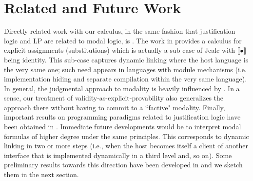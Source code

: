         \section{Related and Future Work}
        \label{relat}
        Directly related work with our calculus, in the same fashion that justification logic and LP \cite{Artemov2001} are related to modal logic, is \cite{Bellin2001}.  The work in \cite{Bellin2001} provides a calculus for explicit assignments (substitutions) which is actually a sub-case of 
        {\sf Jcalc} with $\llbracket\bullet \rrbracket$ being identity. This  sub-case  captures dynamic linking where the host language is the very same one; such need appears in languages with module mechanisms (i.e. implementation hiding and separate compilation within the very same language). In general, the judgmental approach to modality is heavily influenced by \cite{citeulike:5447115}. In a sense, our treatment of validity-as-explicit-provability also generalizes the approach there without having to commit to a ``factive" modality. Finally,  
        important results on programming paradigms related to justification logic have been obtained in \cite{ArtBon07LFCS,BONELLI2012935, bavera2010justification}. 
        Immediate future developments would be to interpret modal formulas of higher degree under the same principles. 
        This corresponds to dynamic linking in two or more steps (i.e., when the host becomes itself a client of another interface that is implemented dynamically in a third level and, so on). 
        Some preliminary results towards this 
        direction have been developed in \cite{DBLP:journals/entcs/PouliasisP14} and we sketch them in the next section. 
        


